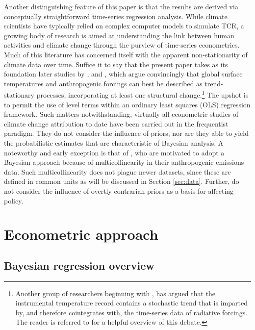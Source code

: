 \documentclass[smallextended]{svjour3}       %
\begin{document}
Another distinguishing feature of this paper is that the results are
derived via conceptually straightforward time-series regression
analysis. While climate scientists have typically relied on complex
computer models to simulate TCR, a growing body of research is aimed at
understanding the link between human activities and climate change
through the purview of time-series econometrics. Much of this literature
has concerned itself with the apparent non-stationarity of climate data
over time. Suffice it to say that the present paper takes as its
foundation later studies by \cite{gay2009global},
\cite{estrada2013statistically} and \cite{estrada2013time}, which argue
convincingly that global surface temperatures and anthropogenic forcings
can best be described as trend-stationary processes, incorporating at
least one structural change.\footnote{Another group of researchers
  beginning with \cite{stern2000detecting}, has argued that the
  instrumental temperature record contains a stochastic trend that is
  imparted by, and therefore cointegrates with, the time-series data of
  radiative forcings. The reader is referred to
  \cite{estrada2013detection} for a helpful overview of this debate.}
The upshot is to permit the use of level terms within an ordinary least
squares (OLS) regression framework. Such matters notwithstanding,
virtually all econometric studies of climate change attribution to date
have been carried out in the frequentist paradigm. They do not consider
the influence of priors, nor are they able to yield the probabilistic
estimates that are characteristic of Bayesian analysis. A noteworthy and
early exception is that of \cite{tol1998bayes}, who are motivated to
adopt a Bayesian approach because of multicollinearity in their
anthropogenic emissions data. Such multicollinearity does not plague
newer datasets, since these are defined in common units as will be
discussed in Section \ref{sec:data}. Further, \cite{tol1998bayes} do not
consider the influence of overtly contrarian priors as a basis for
affecting policy.

\hypertarget{sec:econometric}{%
\section{Econometric approach}\label{sec:econometric}}

\hypertarget{sec:bayesian}{%
\subsection{Bayesian regression overview}\label{sec:bayesian}}
\end{document}
